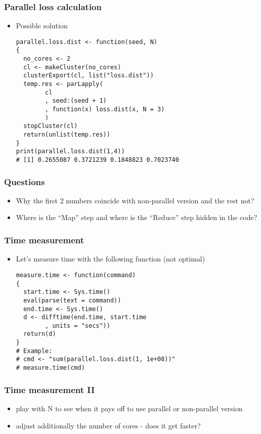 \documentclass[bigger]{beamer}
\begin{document}
\begin{frame}[fragile]
\frametitle{Parallel loss calculation}
\label{sec-3-14}
\begin{itemize}

\item Possible solution\\
\label{sec-3-14-1}%
\begin{verbatim}
parallel.loss.dist <- function(seed, N)
{
  no_cores <- 2
  cl <- makeCluster(no_cores)
  clusterExport(cl, list("loss.dist"))
  temp.res <- parLapply(
        cl
        , seed:(seed + 1)
        , function(x) loss.dist(x, N = 3)
        )
  stopCluster(cl)
  return(unlist(temp.res))
}
print(parallel.loss.dist(1,4))
# [1] 0.2655087 0.3721239 0.1848823 0.7023740
\end{verbatim}


\end{itemize} %
\end{frame}
\begin{frame}
\frametitle{Questions}
\label{sec-3-15}
\begin{itemize}

\item Why the first 2 numbers coincide with non-parallel version and the rest not?
\label{sec-3-15-1}%

\item Where is the ``Map'' step and where is the ``Reduce'' step hidden in the code?
\label{sec-3-15-2}%
\end{itemize} %
\end{frame}
\begin{frame}[fragile]
\frametitle{Time measurement}
\label{sec-3-16}
\begin{itemize}

\item Let's measure time with the following function (not optimal)\\
\label{sec-3-16-1}%
\begin{verbatim}
measure.time <- function(command)
{
  start.time <- Sys.time()
  eval(parse(text = command))
  end.time <- Sys.time()
  d <- difftime(end.time, start.time
        , units = "secs"))
  return(d)
}
# Example:
# cmd <- "sum(parallel.loss.dist(1, 1e+08))"
# measure.time(cmd)
\end{verbatim}


\end{itemize} %
\end{frame}
\begin{frame}
\frametitle{Time measurement II}
\label{sec-3-17}
\begin{itemize}

\item play with N to see when it pays off to use parallel or non-parallel version
\label{sec-3-17-1}%

\item adjust additionally the number of cores - does it get faster?
\label{sec-3-17-2}%
\end{itemize} %
\end{frame}
\end{document}
